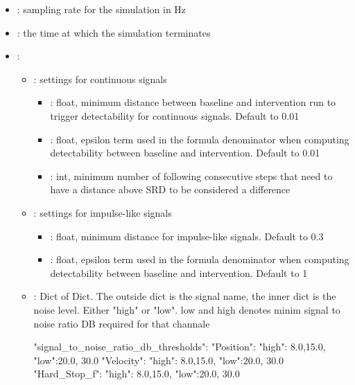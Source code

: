\documentclass[11pt]{article}
\begin{document}
\begin{itemize}
\begin{itemize}
\begin{itemize}
\end{itemize}
    \item {}: sampling rate for the simulation in Hz
    \item {}: the time at which the simulation terminates
    \item {}:
    \begin{itemize}
        \item {}: settings for continuous signals
        \begin{itemize}
            \item \termMinSRDDistance: float, minimum \termSRD distance between baseline and intervention run to trigger detectability for continuous signals. Default to 0.01
            \item {}: float, epsilon term used in the \termSRD formula denominator when computing detectability between baseline and intervention. Default to 0.01
            \item {}: int, minimum number of following consecutive steps that need to have a distance above SRD to be considered a difference
        \end{itemize}
        \item {}: settings for impulse-like signals
        \begin{itemize}
            \item \termMinSRDDistance: float, minimum \termSRD distance for impulse-like signals. Default to 0.3
            \item {}: float, epsilon term used in the \termSRD formula denominator when computing detectability between baseline and intervention. Default to 1
        \end{itemize}
        \item {}: Dict of Dict. The outside dict is the signal name, the inner dict is the noise level. 
        Either "high" or "low". low and high denotes minim signal to noise ratio DB required for that channale
        \begin{DocCode}
            "signal_to_noise_ratio_db_thresholds": {
                "Position": "high": {8.0,15.0}, "low":{20.0, 30.0}
                "Velocity": "high": {8.0,15.0}, "low":{20.0, 30.0}
                "Hard_Stop_f": "high": {8.0,15.0}, "low":{20.0, 30.0}
            }
        \end{DocCode}
    \end{itemize}
\end{itemize}


\end{itemize}
\end{document}
